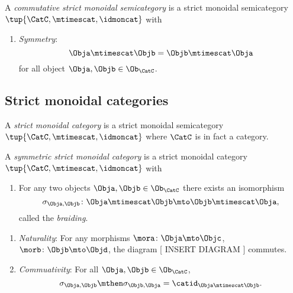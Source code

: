\begin{ctdefinition}
    \label{def:commutative-strict-monoidal}
    A \emph{commutative strict monoidal semicategory} is a strict monoidal semicategory  $\tup{\CatC, \mtimescat, \idmoncat}$ with

    \condit

    \begin{enumerate}
        \item \emph{Symmetry}:
              \begin{equation}
                  \Obja \mtimescat \Objb = \Objb \mtimescat \Obja
              \end{equation}
              for all object $\Obja, \Objb \in \Ob_\CatC$.
    \end{enumerate}
\end{ctdefinition}


\subsection{Strict monoidal categories}

\begin{ctdefinition}
    \label{def:strict-monoidal-category}
    A \emph{strict monoidal category} is a strict monoidal semicategory $\tup{\CatC, \mtimescat, \idmoncat}$ where $\CatC$ is in fact a category.
\end{ctdefinition}

\begin{ctdefinition}
    \label{def:sym-strict-monoidal-semicat}
    A \emph{symmetric strict monoidal category} is a strict monoidal category $\tup{\CatC, \mtimescat, \idmoncat}$ with

    \constit

    \begin{enumerate}
        \item For any two objects $\Obja, \Objb \in \Ob_\CatC$ there exists an isomorphism
              \begin{equation}
                  \sigma_{\Obja, \Objb} \colon \Obja \mtimescat   \Objb \mto \Objb \mtimescat   \Obja,
              \end{equation}
              called the \emph{braiding}.
    \end{enumerate}

    \condit

    \begin{enumerate}
        \item \emph{Naturality}: For any morphisms $\mora \colon \Obja \mto \Objc$, $\morb \colon \Objb \mto \Objd$, the diagram
                  [ INSERT DIAGRAM ]
              commutes.
        \item \emph{Commuativity}: For all $\Obja, \Objb \in \Ob_\CatC$,
              \begin{equation}
                  \sigma_{\Obja, \Objb} \mthen \sigma_{\Objb, \Obja} = \catid_{\Obja \mtimescat   \Objb}.
              \end{equation}
    \end{enumerate}

\end{ctdefinition}



